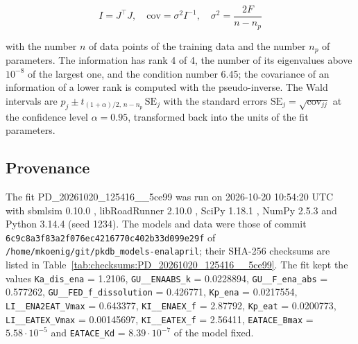\documentclass{article}
\begin{document}
\begin{equation}
I = J^\top J, \quad \mathrm{cov} = \sigma^2 I^{-1}, \quad \sigma^2 = \frac{2 F}{n - n_p}
\end{equation}

with the number $n$ of data points of the training data and the number $n_p$ of parameters. The information has rank 4 of 4, the number of its eigenvalues above $10^{-8}$ of the largest one, and the condition number 6.45; the covariance of an information of a lower rank is computed with the pseudo-inverse. The Wald intervals are $\hat{p}_j \pm t_{(1+\alpha)/2,\, n-n_p}\, \mathrm{SE}_j$ with the standard errors $\mathrm{SE}_j = \sqrt{\mathrm{cov}_{jj}}$ at the confidence level $\alpha = 0.95$, transformed back into the units of the fit parameters.

\subsection{Provenance}

The fit PD\_20261020\_125416\_\_5ce99 was run on 2026-10-20 10:54:20 UTC with sbmlsim 0.10.0 \cite{Koenig2026_sbmlsim}, libRoadRunner 2.10.0 \cite{Welsh2023}, SciPy 1.18.1 \cite{Virtanen2020}, NumPy 2.5.3 \cite{Harris2020} and Python 3.14.4 (seed 1234). The models and data were those of commit \texttt{6c9c8a3f83a2f076ec4216770c402b33d099e29f} of \texttt{/home/mkoenig/git/pkdb\_models-enalapril}; their SHA-256 checksums are listed in Table~\ref{tab:checksums:PD_20261020_125416__5ce99}. The fit kept the values \texttt{Ka\_dis\_ena} = 1.2106, \texttt{GU\_\_ENAABS\_k} = 0.0228894, \texttt{GU\_\_F\_ena\_abs} = 0.577262, \texttt{GU\_\_FED\_f\_dissolution} = 0.426771, \texttt{Kp\_ena} = 0.0217554, \texttt{LI\_\_ENA2EAT\_Vmax} = 0.643377, \texttt{KI\_\_ENAEX\_f} = 2.87792, \texttt{Kp\_eat} = 0.0200773, \texttt{LI\_\_EATEX\_Vmax} = 0.00145697, \texttt{KI\_\_EATEX\_f} = 2.56411, \texttt{EATACE\_Bmax} = $5.58 \cdot 10^{-5}$ and \texttt{EATACE\_Kd} = $8.39 \cdot 10^{-7}$ of the model fixed.
\end{document}
